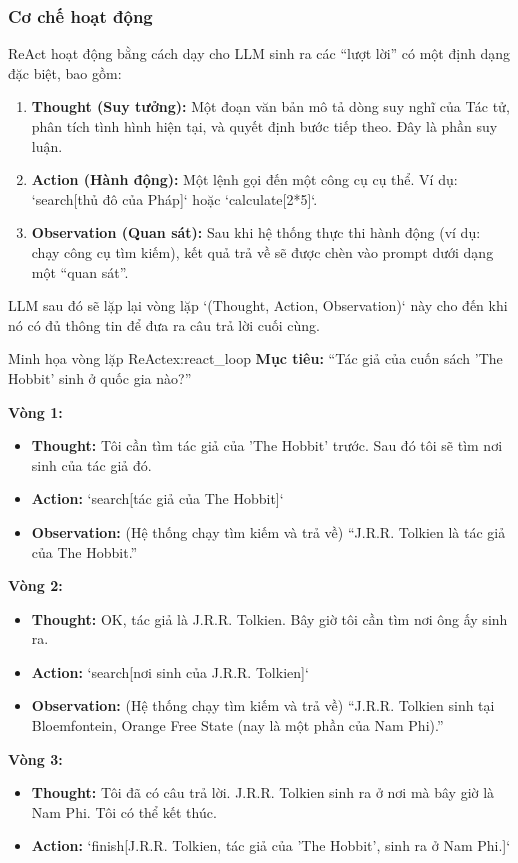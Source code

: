 \subsubsection{Cơ chế hoạt động}
ReAct hoạt động bằng cách dạy cho LLM sinh ra các “lượt lời” có một định dạng đặc biệt, bao gồm:
\begin{enumerate}
    \item \textbf{Thought (Suy tưởng):} Một đoạn văn bản mô tả dòng suy nghĩ của Tác tử, phân tích tình hình hiện tại, và quyết định bước tiếp theo. Đây là phần suy luận.
    \item \textbf{Action (Hành động):} Một lệnh gọi đến một công cụ cụ thể. Ví dụ: `search[thủ đô của Pháp]` hoặc `calculate[2*5]`.
    \item \textbf{Observation (Quan sát):} Sau khi hệ thống thực thi hành động (ví dụ: chạy công cụ tìm kiếm), kết quả trả về sẽ được chèn vào prompt dưới dạng một “quan sát”.
\end{enumerate}

LLM sau đó sẽ lặp lại vòng lặp `(Thought, Action, Observation)` này cho đến khi nó có đủ thông tin để đưa ra câu trả lời cuối cùng.

\begin{example}{Minh họa vòng lặp ReAct}{ex:react_loop}
    \textbf{Mục tiêu:} “Tác giả của cuốn sách 'The Hobbit' sinh ở quốc gia nào?”
    
    \textbf{Vòng 1:}
    \begin{itemize}
        \item \textbf{Thought:} Tôi cần tìm tác giả của 'The Hobbit' trước. Sau đó tôi sẽ tìm nơi sinh của tác giả đó.
        \item \textbf{Action:} `search[tác giả của The Hobbit]`
        \item \textbf{Observation:} (Hệ thống chạy tìm kiếm và trả về) “J.R.R. Tolkien là tác giả của The Hobbit.”
    \end{itemize}

    \textbf{Vòng 2:}
    \begin{itemize}
        \item \textbf{Thought:} OK, tác giả là J.R.R. Tolkien. Bây giờ tôi cần tìm nơi ông ấy sinh ra.
        \item \textbf{Action:} `search[nơi sinh của J.R.R. Tolkien]`
        \item \textbf{Observation:} (Hệ thống chạy tìm kiếm và trả về) “J.R.R. Tolkien sinh tại Bloemfontein, Orange Free State (nay là một phần của Nam Phi).”
    \end{itemize}
    
    \textbf{Vòng 3:}
    \begin{itemize}
        \item \textbf{Thought:} Tôi đã có câu trả lời. J.R.R. Tolkien sinh ra ở nơi mà bây giờ là Nam Phi. Tôi có thể kết thúc.
        \item \textbf{Action:} `finish[J.R.R. Tolkien, tác giả của 'The Hobbit', sinh ra ở Nam Phi.]`
    \end{itemize}
\end{example}

